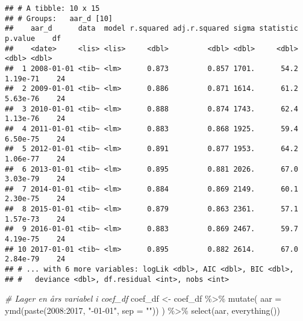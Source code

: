 \documentclass[
]{article}
\newenvironment{Shaded}{\begin{snugshade}}{\end{snugshade}}
\newcommand{\AttributeTok}[1]{\textcolor[rgb]{0.77,0.63,0.00}{#1}}
\newcommand{\CommentTok}[1]{\textcolor[rgb]{0.56,0.35,0.01}{\textit{#1}}}
\newcommand{\DecValTok}[1]{\textcolor[rgb]{0.00,0.00,0.81}{#1}}
\newcommand{\FunctionTok}[1]{\textcolor[rgb]{0.00,0.00,0.00}{#1}}
\newcommand{\NormalTok}[1]{#1}
\newcommand{\OtherTok}[1]{\textcolor[rgb]{0.56,0.35,0.01}{#1}}
\newcommand{\SpecialCharTok}[1]{\textcolor[rgb]{0.00,0.00,0.00}{#1}}
\newcommand{\StringTok}[1]{\textcolor[rgb]{0.31,0.60,0.02}{#1}}
\begin{document}
\begin{verbatim}
## # A tibble: 10 x 15
## # Groups:   aar_d [10]
##    aar_d      data  model r.squared adj.r.squared sigma statistic  p.value    df
##    <date>     <lis> <lis>     <dbl>         <dbl> <dbl>     <dbl>    <dbl> <dbl>
##  1 2008-01-01 <tib~ <lm>      0.873         0.857 1701.      54.2 1.19e-71    24
##  2 2009-01-01 <tib~ <lm>      0.886         0.871 1614.      61.2 5.63e-76    24
##  3 2010-01-01 <tib~ <lm>      0.888         0.874 1743.      62.4 1.13e-76    24
##  4 2011-01-01 <tib~ <lm>      0.883         0.868 1925.      59.4 6.50e-75    24
##  5 2012-01-01 <tib~ <lm>      0.891         0.877 1953.      64.2 1.06e-77    24
##  6 2013-01-01 <tib~ <lm>      0.895         0.881 2026.      67.0 3.03e-79    24
##  7 2014-01-01 <tib~ <lm>      0.884         0.869 2149.      60.1 2.30e-75    24
##  8 2015-01-01 <tib~ <lm>      0.879         0.863 2361.      57.1 1.57e-73    24
##  9 2016-01-01 <tib~ <lm>      0.883         0.869 2467.      59.7 4.19e-75    24
## 10 2017-01-01 <tib~ <lm>      0.895         0.882 2614.      67.0 2.84e-79    24
## # ... with 6 more variables: logLik <dbl>, AIC <dbl>, BIC <dbl>,
## #   deviance <dbl>, df.residual <int>, nobs <int>
\end{verbatim}

\begin{Shaded}
\end{Shaded}

\begin{Shaded}
\begin{Highlighting}[]
\CommentTok{\# Lager en års variabel i coef\_df}
\NormalTok{coef\_df }\OtherTok{\textless{}{-}}\NormalTok{ coef\_df }\SpecialCharTok{\%\textgreater{}\%} 
  \FunctionTok{mutate}\NormalTok{(}
    \AttributeTok{aar =} \FunctionTok{ymd}\NormalTok{(}\FunctionTok{paste}\NormalTok{(}\DecValTok{2008}\SpecialCharTok{:}\DecValTok{2017}\NormalTok{, }\StringTok{"{-}01{-}01"}\NormalTok{, }\AttributeTok{sep =} \StringTok{""}\NormalTok{))}
\NormalTok{  ) }\SpecialCharTok{\%\textgreater{}\%} 
  \FunctionTok{select}\NormalTok{(aar, }\FunctionTok{everything}\NormalTok{())}
\end{Highlighting}
\end{Shaded}
\end{document}
